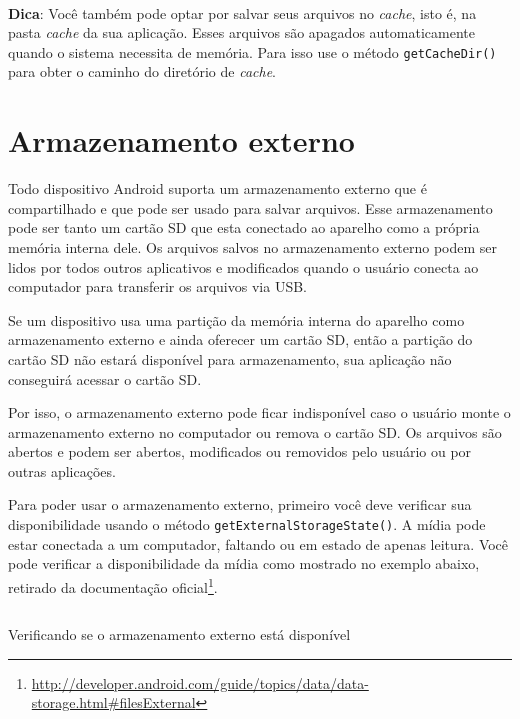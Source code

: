 \documentclass[a4paper,12pt,brazil,oneside]{book}
\begin{document}
\begin{framed}
\paragraph{}\textbf{Dica}: Você também pode optar por salvar seus arquivos no \emph{cache}, isto é, na pasta \emph{cache} da sua aplicação. Esses arquivos são apagados automaticamente quando o sistema necessita de memória. Para isso use o método \texttt{getCacheDir()} para obter o caminho do diretório de \emph{cache}.
\textit{}
\end{framed}

		\section{Armazenamento externo}

		Todo dispositivo Android suporta um armazenamento externo que é compartilhado e que pode ser usado para salvar arquivos. Esse armazenamento pode ser tanto um cartão SD que esta conectado ao aparelho como a própria memória interna dele. Os arquivos salvos no armazenamento externo podem ser lidos por todos outros aplicativos e modificados quando o usuário conecta ao computador para transferir os arquivos via USB.

		Se um dispositivo usa uma partição da memória interna do aparelho como armazenamento externo e ainda oferecer um cartão SD, então a partição do cartão SD não estará disponível para armazenamento, sua aplicação não conseguirá acessar o cartão SD. 

		Por isso, o armazenamento externo pode ficar indisponível caso o usuário monte o armazenamento externo no computador ou remova o cartão SD. Os arquivos são abertos e podem ser abertos, modificados ou removidos pelo usuário ou por outras aplicações.

		Para poder usar o armazenamento externo, primeiro você deve verificar sua disponibilidade usando o método \texttt{getExternalStorageState()}. A mídia pode estar conectada a um computador, faltando ou em estado de apenas leitura. Você pode verificar a disponibilidade da mídia como mostrado no exemplo abaixo, retirado da documentação oficial\footnote{\href{http://developer.android.com/guide/topics/data/data-storage.html\#filesExternal}{http://developer.android.com/guide/topics/data/data-storage.html\#filesExternal}}.

		\begin{listing}[H]
		\inputminted[linenos=true,fontsize=\small,frame=lines, framesep=2mm, tabsize=2,numbersep=5pt]{java}{src/api/storage/external1.java}
		\caption{Verificando se o armazenamento externo está disponível}
		\label{code:external1}
		\end{listing} 	
\end{document}
